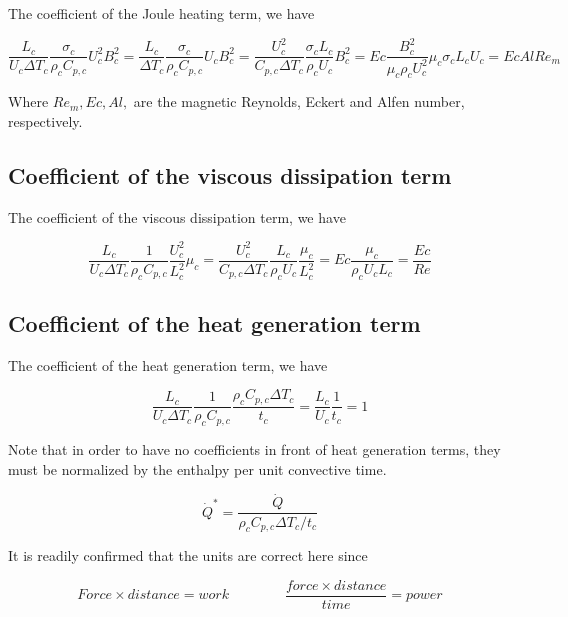 \documentclass[11pt]{article}
\begin{document}
The coefficient of the Joule heating term, we have

\begin{equation}
	\frac{L_c}{U_c \Delta T_c}
	\frac{\sigma_c}{\rho_c C_{p,c}}
	U_c^2 B_c^2
	=
	\frac{L_c}{\Delta T_c}
	\frac{\sigma_c}{\rho_c C_{p,c}}
	U_c B_c^2
	=
	\frac{U_c^2}{C_{p,c} \Delta T_c}
	\frac{\sigma_c L_c}{\rho_c U_c}
	B_c^2
	=
	Ec
	\frac{B_c^2}{\mu_c \rho_c U_c^2}
	\mu_c \sigma_c L_c U_c
	=
	Ec Al Re_m
\end{equation}

Where $Re_m,Ec,Al,$ are the magnetic Reynolds, Eckert and Alfen number, respectively. 

\subsection{Coefficient of the viscous dissipation term}
The coefficient of the viscous dissipation term, we have

\begin{equation}
	\frac{L_c}{U_c \Delta T_c}
	\frac{1}{\rho_c C_{p,c}}
	\frac{U_c^2}{L_c^2}\mu_c
	=
	\frac{U_c^2}{C_{p,c} \Delta T_c}
	\frac{L_c}{\rho_c U_c}
	\frac{\mu_c}{L_c^2}
	=
	Ec
	\frac{\mu_c}{\rho_c U_c L_c}
	=
	\frac{Ec}{Re}
\end{equation}

\subsection{Coefficient of the heat generation term}
The coefficient of the heat generation term, we have

\begin{equation}
	\frac{L_c}{U_c \Delta T_c}
	\frac{1}{\rho_c C_{p,c}}
	\frac{\rho_c C_{p,c} \Delta T_c}{t_c}
	=
	\frac{L_c}{U_c}
	\frac{1}{t_c}
	= 1
\end{equation}

Note that in order to have no coefficients in front of heat generation terms, they must be normalized by the enthalpy per unit convective time.

\begin{equation}
	\dot{Q}^* = \frac{\dot{Q}}{\rho_c C_{p,c} \Delta T_c / t_c}
\end{equation}

It is readily confirmed that the units are correct here since 

\begin{equation}
	Force \times distance = work
	\qquad \qquad
	\frac{force \times distance}{time} = power
\end{equation}
\end{document}
